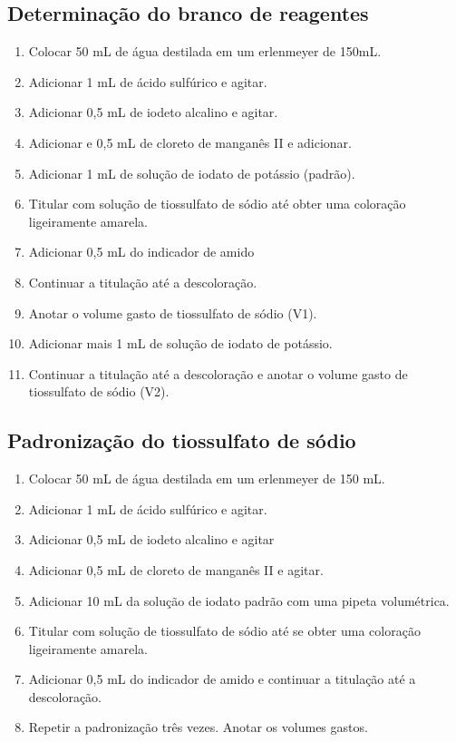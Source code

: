 \documentclass[a4paper,10pt]{SelfArx}
\begin{document}
\subsection{Determinação do branco de reagentes}
\begin{enumerate}[noitemsep]
	
\item Colocar 50 mL de água destilada em um erlenmeyer de 150mL.
\item Adicionar 1 mL de ácido sulfúrico e agitar.
\item Adicionar 0,5 mL de iodeto alcalino e agitar.
\item Adicionar e 0,5 mL de cloreto de manganês II e adicionar. 
\item Adicionar 1 mL de solução de iodato de potássio (padrão).
\item Titular com solução de tiossulfato de sódio até obter uma coloração ligeiramente amarela. 
\item Adicionar 0,5 mL do indicador de amido 
\item Continuar a titulação até a descoloração. 
\item Anotar o volume gasto de tiossulfato de sódio (V1).
\item Adicionar mais 1 mL de solução de iodato de potássio.
\item Continuar a titulação até a descoloração e anotar o volume gasto de tiossulfato de sódio (V2).
\end{enumerate}


\subsection{Padronização do tiossulfato de sódio}
\begin{enumerate}[noitemsep]

\item Colocar 50 mL de água destilada em um erlenmeyer de 150 mL. 
\item Adicionar 1 mL de ácido sulfúrico e agitar.
\item Adicionar 0,5 mL de iodeto alcalino e agitar
\item Adicionar 0,5 mL de cloreto de manganês II e agitar.
\item Adicionar 10 mL da solução de iodato padrão com uma pipeta volumétrica.
\item Titular com solução de tiossulfato de sódio até se obter uma coloração ligeiramente amarela. 
\item Adicionar 0,5 mL do indicador de amido e continuar a titulação até a descoloração. 
\item Repetir a padronização três vezes. Anotar os volumes gastos.

\end{enumerate}
\end{document}
